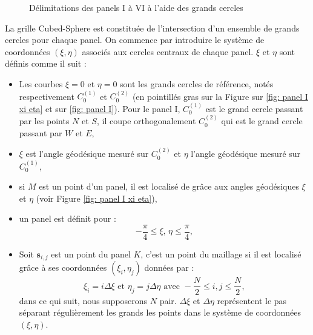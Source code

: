 \begin{figure}[htbp]
\begin{center}
\end{center}
\caption{Délimitations des panels I à VI à l'aide des grands cercles}
\label{fig: panel I to VI}
\end{figure}




La grille Cubed-Sphere est constituée de l'intersection d'un ensemble de grands cercles pour chaque panel. On commence par introduire le système de coordonnées $(\xi,\eta)$ associés aux cercles centraux de chaque panel. $\xi$ et  $\eta$ sont définis comme il suit :

\begin{itemize}
\item Les courbes $\xi = 0$ et $\eta = 0$ sont les grands cercles de référence, notés respectivement $C_0^{(1)}$ et $C_0^{(2)}$ (en pointillés gras sur la Figure sur \ref{fig: panel I xi eta} et sur \ref{fig: panel I}). Pour le panel I, $C_0^{(1)}$ est le grand cercle passant par les points $N$ et $S$, il coupe orthogonalement $C_0^{(2)}$ qui est le grand cercle passant par $W$ et $E$,

\item $\xi$ est l'angle géodésique mesuré sur $C_0^{(2)}$ et $\eta$ l'angle géodésique mesuré sur $C_0^{(1)}$,

\item si $M$ est un point d'un panel, il est localisé de grâce aux angles géodésiques $\xi$ et $\eta$  (voir Figure \ref{fig: panel I xi eta}),

\item un panel est définit pour :
\begin{equation}
- \dfrac{\pi}{4} \leq \xi\text{, }\eta \leq \dfrac{\pi}{4},
\end{equation}

\item Soit $\mathbf{s}_{i,j}$ est un point du panel $K$, c'est un point du maillage si il est localisé grâce à ses coordonnées $(\xi_i, \eta_j)$ données par :
\begin{equation}
\xi_i = i \Delta \xi \text{ et } \eta_j = j \Delta \eta \text{ avec } -\dfrac{N}{2} \leq i,j \leq \dfrac{N}{2},
\end{equation}
dans ce qui suit, nous supposerons $N$ pair. $\Delta \xi$ et $\Delta \eta$ représentent le pas séparant régulièrement les grands les points dans le système de coordonnées $(\xi, \eta)$. 
\end{itemize}

